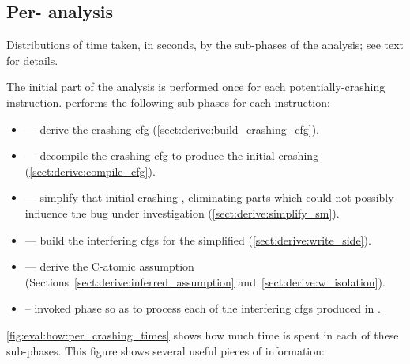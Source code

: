 \newpage
\subsection{Per- analysis}

\begin{sanefig}
  \caption{Distributions of time taken, in seconds, by the
     sub-phases of the analysis; see text for details.}
  \label{fig:eval:how:per_crashing_times}
\end{sanefig}

\noindent
The initial part of the analysis is performed once for each
potentially-crashing instruction.  {\Technique} performs the following
sub-phases for each instruction:
\begin{itemize}
\item {} --- derive the crashing \gls{cfg}
  (\autoref{sect:derive:build_crashing_cfg}).
\item {} --- decompile the crashing \gls{cfg} to produce the
  initial crashing {\StateMachine}
  (\autoref{sect:derive:compile_cfg}).
\item {} --- simplify that initial crashing {\StateMachine},
  eliminating parts which could not possibly influence the bug under
  investigation (\autoref{sect:derive:simplify_sm}).
\item {} --- build the interfering \glspl{cfg} for the
  simplified {\StateMachine} (\autoref{sect:derive:write_side}).
\item {} --- derive the C-atomic assumption
  (Sections~\ref{sect:derive:inferred_assumption}
  and~\ref{sect:derive:w_isolation}).
\item {} -- invoked phase \subinterfering{} so as to process
  each of the interfering \glspl{cfg} produced in .
\end{itemize}
\autoref{fig:eval:how:per_crashing_times} shows how much time is spent
in each of these sub-phases.  This figure shows several useful pieces
of information:
